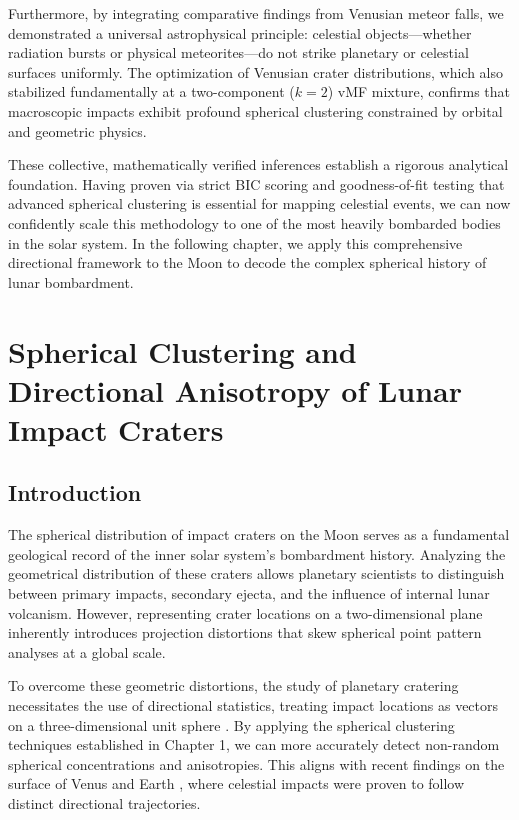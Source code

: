\documentclass[12pt,a4paper]{report}
\begin{document}
Furthermore, by integrating comparative findings from Venusian meteor falls, we demonstrated a universal astrophysical principle: celestial objects—whether radiation bursts or physical meteorites—do not strike planetary or celestial surfaces uniformly. The optimization of Venusian crater distributions, which also stabilized fundamentally at a two-component ($k=2$) vMF mixture, confirms that macroscopic impacts exhibit profound spherical clustering constrained by orbital and geometric physics. 

These collective, mathematically verified inferences establish a rigorous analytical foundation. Having proven via strict BIC scoring and goodness-of-fit testing that advanced spherical clustering is essential for mapping celestial events, we can now confidently scale this methodology to one of the most heavily bombarded bodies in the solar system. In the following chapter, we apply this comprehensive directional framework to the Moon to decode the complex spherical history of lunar bombardment.

\clearpage
\chapter{Spherical Clustering and Directional Anisotropy of Lunar Impact Craters}

\section{Introduction}
The spherical distribution of impact craters on the Moon serves as a fundamental geological record of the inner solar system's bombardment history. Analyzing the geometrical distribution of these craters allows planetary scientists to distinguish between primary impacts, secondary ejecta, and the influence of internal lunar volcanism. However, representing crater locations on a two-dimensional plane inherently introduces projection distortions that skew spherical point pattern analyses at a global scale. 

To overcome these geometric distortions, the study of planetary cratering necessitates the use of directional statistics, treating impact locations as vectors on a three-dimensional unit sphere \cite{mardia2000}. By applying the spherical clustering techniques established in Chapter 1, we can more accurately detect non-random spherical concentrations and anisotropies. This aligns with recent findings on the surface of Venus \cite{chatterjee2025} and Earth \cite{ghosh2024celestial}, where celestial impacts were proven to follow distinct directional trajectories.
\end{document}
